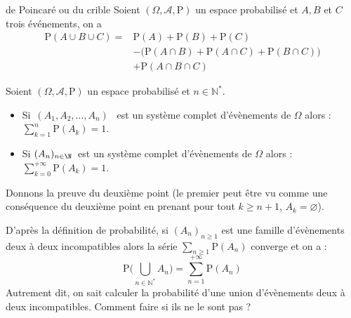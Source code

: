\documentclass[french,11pt,twoside]{VcCours}
\renewcommand{\P}{\text{P}}
\begin{document}
\begin{Theoreme}{\label{Prop2}de Poincaré ou du crible}
Soient $(\Omega, \mathcal{A}, \P)$ un espace probabilisé et $A, B$ et $C$ trois événements, on a
 \begin{align*}
  \P(A\cup B \cup C) = & \P(A) + \P(B) + \P(C) \\
  &- \Big( \P(A\cap B) + \P(A\cap C) + \P(B\cap C) \Big) \\
  &+ \P(A\cap B \cap C)
 \end{align*}
\end{Theoreme}


\begin{Proposition}{}
Soient $(\Omega, \mathcal{A}, \P)$ un espace probabilisé et $n \in \mathbb{N}^*$.
\begin{itemize}
\item Si $\,(A_1, A_2,\ldots, A_n)$ \ est un système complet d'évènements de $\Omega$ alors :
$\sum\limits_{k=1}^{n } \P(A_k) = 1$. 
\item Si $(A_n)_{n\in \N}\,$ est un système complet d'évènements de $\Omega$ alors :
$\sum\limits_{k=0}^{+\infty } \P(A_k) = 1$. 
\end{itemize}
\end{Proposition}

\begin{Demonstration}{} Donnons la preuve du deuxième point (le premier peut être vu comme une conséquence du deuxième point en prenant pour tout $k \geq n+1$, $A_{k}= \varnothing$). 

\vspace{5cm}
%
\end{Demonstration}



D'après la définition de probabilité, si $(A_n)_{n \geq 1}$ est une famille d'évènements deux à deux incompatibles alors la série $\sum_{n \geq 1} \P(A_n)$ converge et on a : 
\[ \P\Big(\bigcup\limits_{n\in \mathbb N^*} A_n\Big) = \sum_{n=1}^{+ \infty} \P (A_n) \]
Autrement dit, on sait calculer la probabilité d'une union d'évènements deux à deux incompatibles. Comment faire si ils ne le sont pas ?

%
\end{document}
